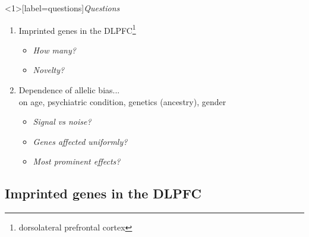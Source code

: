 \documentclass{beamer}
\begin{document}
%
%
%
%
%

\begin{frame}<1>[label=questions]{\textit{Questions} }
\begin{enumerate}
\item Imprinted genes in the DLPFC\footnote{dorsolateral prefrontal
cortex}
\begin{itemize}
\item \textit{How many?} 
\item \textit{Novelty?} 
\end{itemize}
\item Dependence of allelic bias...\\on age, psychiatric condition, genetics
(ancestry),
gender
\begin{itemize}
\item \textit{Signal vs noise?} 
\item \textit{Genes affected uniformly?} 
\item \textit{Most prominent effects?} 
\end{itemize}
\end{enumerate}
\end{frame}

\subsection{Imprinted genes in the DLPFC}
\end{document}
